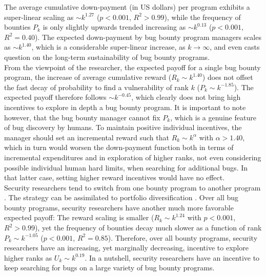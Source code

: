 The average cumulative down-payment (in US dollars) per program exhibits a super-linear scaling as $\sim k^{1.27}$ ($ p < 0.001$, $R^2 > 0.99$), while the frequency of bounties $P_k$ is only slightly upwards trended increasing as $ \sim k^{0.13}$ ($ p < 0.001$, $R^2 = 0.40$). The expected down-payment by bug bounty program managers scales as $\sim k^{1.40}$, which is a considerable super-linear increase, as $k \rightarrow \infty$, and even casts question on the long-term sustainability of bug bounty programs. \\

From the viewpoint of the researcher, the expected payoff for a single bug bounty program, the increase of average cumulative reward ($R_{k} \sim k^{1.40}$) does not offset the fast decay of probability to find a vulnerability of rank $k$ ($P_{k} \sim k^{-1.85}$). The expected payoff therefore follows $\sim k^{-0.45}$, which clearly does not bring high incentives to explore in depth a bug bounty program. It is important to note however, that the bug bounty manager cannot fix $P_k$, which is a genuine feature of bug discovery by humans. To maintain positive individual incentives, the manager should set an incremental reward such that $R_k \sim k^{\alpha}$ with $\alpha > 1.40$, which in turn would worsen the down-payment function both in terms of incremental expenditures and in exploration of higher ranks, not even considering possible individual human hard limits, when searching for additional bugs. In that latter case, setting higher reward incentives would have no effect.\\

Security researchers tend to switch from one bounty program to another program \cite{zhao2014exploratory,zhao2015empirical}. The strategy can be assimilated to portfolio diversification \cite{goetzmann2008equity}. Over all bug bounty programs, security researchers have another much more favorable expected payoff: The reward scaling is smaller ($R_{k} \sim k^{1.24}$ with $ p < 0.001$, $R^2 > 0.99$), yet the frequency of bounties decay much slower as a function of rank $P_{k} \sim k^{-1.05}$ ($ p < 0.001$, $R^2 = 0.85$). Therefore, over all bounty programs, security researchers have an increasing, yet marginally decreasing, incentive to explore higher ranks as $U_k \sim k^{0.19}$. In a nutshell, security researchers have an incentive to keep searching for bugs on a large variety of bug bounty programs. 

